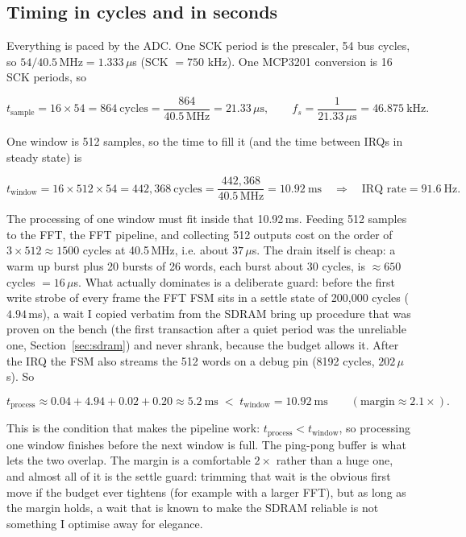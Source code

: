 \documentclass[a4paper,11pt]{article}
\begin{document}
\subsection{Timing in cycles and in seconds}

Everything is paced by the ADC. One SCK period is the prescaler, 54 bus cycles, so
$54/40.5\,\mathrm{MHz} = 1.333\,\mu$s (SCK $=750$ kHz). One MCP3201 conversion is 16
SCK periods, so

\[
t_\mathrm{sample} = 16\times 54 = 864\ \text{cycles} = \frac{864}{40.5\,\mathrm{MHz}} = 21.33\,\mu\text{s},
\qquad f_s = \frac{1}{21.33\,\mu\text{s}} = 46.875\ \text{kHz}.
\]

One window is 512 samples, so the time to fill it (and the time between IRQs in
steady state) is

\[
t_\mathrm{window} = 16\times 512\times 54 = 442{,}368\ \text{cycles}
= \frac{442{,}368}{40.5\,\mathrm{MHz}} = 10.92\ \text{ms}
\quad\Rightarrow\quad \text{IRQ rate} = 91.6\ \text{Hz}.
\]

The processing of one window must fit inside that 10.92\,ms. Feeding 512 samples to
the FFT, the FFT pipeline, and collecting 512 outputs cost on the order of
$3\times 512 \approx 1500$ cycles at 40.5\,MHz, i.e. about $37\,\mu$s. The drain
itself is cheap: a warm up burst plus 20 bursts of 26 words, each burst about 30
cycles, is $\approx 650$ cycles $= 16\,\mu$s. What actually dominates is a
deliberate guard: before the first write strobe of every frame the FFT FSM sits
in a settle state of 200{,}000 cycles ($4.94$\,ms), a wait I copied verbatim from
the SDRAM bring up procedure that was proven on the bench (the first transaction
after a quiet period was the unreliable one, Section~\ref{sec:sdram}) and never
shrank, because the budget allows it. After the IRQ the FSM also streams the 512
words on a debug pin (8192 cycles, $202\,\mu$s). So

\[
t_\mathrm{process} \approx 0.04 + 4.94 + 0.02 + 0.20 \approx 5.2\ \text{ms}
\;<\; t_\mathrm{window} = 10.92\ \text{ms}
\qquad\left(\text{margin} \approx 2.1\times\right).
\]

This is the condition that makes the pipeline work: $t_\mathrm{process} <
t_\mathrm{window}$, so processing one window finishes before the next window is
full. The ping-pong buffer is what lets the two overlap. The margin is a
comfortable $2\times$ rather than a huge one, and almost all of it is the settle
guard: trimming that wait is the obvious first move if the budget ever tightens
(for example with a larger FFT), but as long as the margin holds, a wait that is
known to make the SDRAM reliable is not something I optimise away for elegance.
\end{document}
